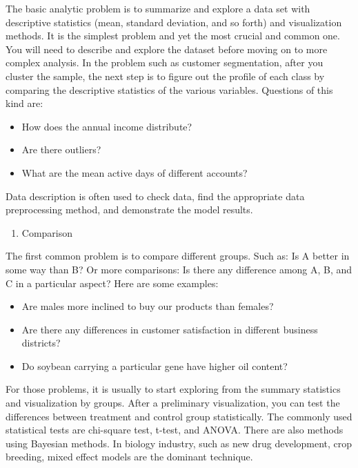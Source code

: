 \documentclass[12pt,]{krantz}
\providecommand{\tightlist}{%
  \setlength{\itemsep}{0pt}\setlength{\parskip}{0pt}}
\theoremstyle{definition}
\theoremstyle{definition}
\theoremstyle{definition}
\theoremstyle{remark}
\begin{document}
The basic analytic problem is to summarize and explore a data set with
descriptive statistics (mean, standard deviation, and so forth) and
visualization methods. It is the simplest problem and yet the most
crucial and common one. You will need to describe and explore the
dataset before moving on to more complex analysis. In the problem such
as customer segmentation, after you cluster the sample, the next step is
to figure out the profile of each class by comparing the descriptive
statistics of the various variables. Questions of this kind are:

\begin{itemize}
\tightlist
\item
  How does the annual income distribute?
\item
  Are there outliers?
\item
  What are the mean active days of different accounts?
\end{itemize}

Data description is often used to check data, find the appropriate data
preprocessing method, and demonstrate the model results.

\begin{enumerate}
\def\labelenumi{\arabic{enumi}.}
\setcounter{enumi}{1}
\tightlist
\item
  Comparison
\end{enumerate}

The first common problem is to compare different groups. Such as: Is A
better in some way than B? Or more comparisons: Is there any difference
among A, B, and C in a particular aspect? Here are some examples:

\begin{itemize}
\tightlist
\item
  Are males more inclined to buy our products than females?
\item
  Are there any differences in customer satisfaction in different
  business districts?
\item
  Do soybean carrying a particular gene have higher oil content?
\end{itemize}

For those problems, it is usually to start exploring from the summary
statistics and visualization by groups. After a preliminary
visualization, you can test the differences between treatment and
control group statistically. The commonly used statistical tests are
chi-square test, t-test, and ANOVA. There are also methods using
Bayesian methods. In biology industry, such as new drug development,
crop breeding, mixed effect models are the dominant technique.
\end{document}
